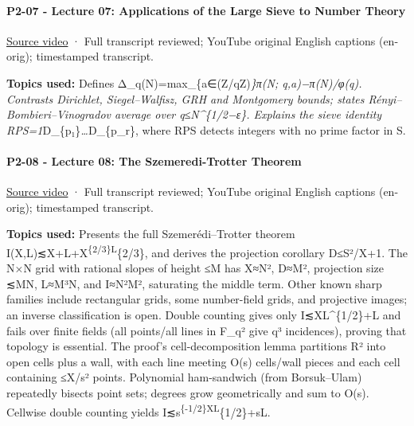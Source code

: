 \paragraph{P2-07 - Lecture 07: Applications of the Large Sieve to Number Theory}\label{p2-07---lecture-07-applications-of-the-large-sieve-to-number-theory}

\href{https://www.youtube.com/watch?v=-UJgxLaFzfM}{Source video} · Full transcript reviewed; YouTube original English captions (en-orig); timestamped transcript.

\textbf{Topics used:} Defines Δ\_q(N)=max\_\{a∈(Z/qZ)\emph{\}\textbar π(N; q,a)−π(N)/φ(q)\textbar. Contrasts Dirichlet, Siegel--Walfisz, GRH and Montgomery bounds; states Rényi--Bombieri--Vinogradov average over q≤N\^{}\{1/2−ε\}. Explains the sieve identity RPS=1}D\_\{p₁\}\emph{\ldots{}}D\_\{p\_r\}, where RPS detects integers with no prime factor in S.

\paragraph{P2-08 - Lecture 08: The Szemeredi-Trotter Theorem}\label{p2-08---lecture-08-the-szemeredi-trotter-theorem}

\href{https://www.youtube.com/watch?v=3h0jvsOnTIc}{Source video} · Full transcript reviewed; YouTube original English captions (en-orig); timestamped transcript.

\textbf{Topics used:} Presents the full Szemerédi--Trotter theorem I(X,L)≲\textbar X\textbar+\textbar L\textbar+\textbar X\textbar{}\textsuperscript{\{2/3\}\textbar L\textbar{}}\{2/3\}, and derives the projection corollary \textbar D\textbar≤S²/\textbar X\textbar+1. The N×N grid with rational slopes of height ≤M has \textbar X\textbar≈N², \textbar D\textbar≈M², projection size ≲MN, \textbar L\textbar≈M³N, and I≈N²M², saturating the middle term. Other known sharp families include rectangular grids, some number-field grids, and projective images; an inverse classification is open. Double counting gives only I≲\textbar X\textbar\textbar L\textbar\^{}\{1/2\}+\textbar L\textbar{} and fails over finite fields (all points/all lines in F\_q² give q³ incidences), proving that topology is essential. The proof's cell-decomposition lemma partitions R² into open cells plus a wall, with each line meeting O(s) cells/wall pieces and each cell containing ≤\textbar X\textbar/s² points. Polynomial ham-sandwich (from Borsuk--Ulam) repeatedly bisects point sets; degrees grow geometrically and sum to O(s). Cellwise double counting yields I≲s\textsuperscript{\{-1/2\}\textbar X\textbar\textbar L\textbar{}}\{1/2\}+s\textbar L\textbar.

